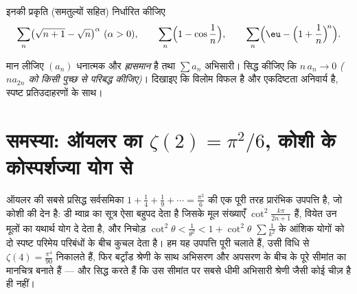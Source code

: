 \begin{exercise}[$\star\star$]\label{exo:b2:series:11}
इनकी प्रकृति (समतुल्यों सहित) निर्धारित कीजिए
\[
\sum_n \bigl(\sqrt{n+1} - \sqrt n\bigr)^{\alpha}
\ (\alpha > 0), \qquad
\sum_n \Bigl(1 - \cos\frac1n\Bigr), \qquad
\sum_n \Bigl(\eu - \Bigl(1 + \frac1n\Bigr)^{\!n}\Bigr).
\]
\end{exercise}

\begin{exercise}[$\star\star\star$]\label{exo:b2:series:12}
मान लीजिए $(a_n)$ धनात्मक और \emph{ह्रासमान} है तथा $\sum a_n$ अभिसारी। सिद्ध कीजिए
कि $n\,a_n \to 0$ \emph{($n a_{2n}$ को किसी पुच्छ से परिबद्ध कीजिए)}। दिखाइए कि विलोम विफल
है और एकदिष्टता अनिवार्य है, स्पष्ट प्रतिउदाहरणों के साथ।
\end{exercise}

\section{समस्या: ऑयलर का $\zeta(2) = \pi^2/6$, कोशी के कोस्पर्शज्या योग से}

ऑयलर की सबसे प्रसिद्ध सर्वसमिका $1 + \frac14 + \frac19 + \cdots =
\frac{\pi^2}6$ की एक पूरी तरह प्रारंभिक उपपत्ति है,
जो कोशी की देन है: डी म्वाव्र का सूत्र ऐसा बहुपद देता है जिसके मूल
संख्याएँ $\cot^2\frac{k\pi}{2n+1}$ हैं, वियेत उन मूलों का यथार्थ योग दे देता है, और निचोड़
$\cot^2\theta < \frac{1}{\theta^2} <
1 + \cot^2\theta$ $\sum\frac1{k^2}$ के आंशिक योगों को दो स्पष्ट परिमेय परिबंधों के बीच कुचल देता है।
हम यह उपपत्ति पूरी चलाते हैं, उसी विधि से $\zeta(4) = \frac{\pi^4}{90}$ निकालते हैं, फिर
बर्ट्रांड श्रेणी के साथ अभिसरण और अपसरण के बीच के पूरे सीमांत का मानचित्र
बनाते हैं --- और सिद्ध करते हैं कि उस सीमांत पर सबसे धीमी अभिसारी श्रेणी
जैसी कोई चीज़ है ही नहीं।

